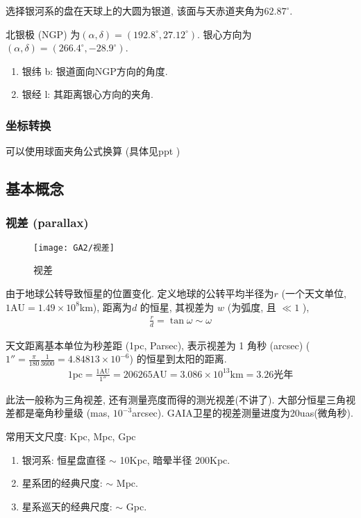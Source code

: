 选择银河系的盘在天球上的大圆为银道, 该面与天赤道夹角为$62.87^{\circ}$. 

北银极 (NGP) 为$(\alpha, \delta)=(192.8^{\circ}, 27.12^{\circ}) $. 银心方向为$(\alpha, \delta)=(266.4^{\circ},-28.9^{\circ})$. 

\begin{enumerate}
    \item 银纬 b: 银道面向NGP方向的角度. 
    \item 银经 l: 其距离银心方向的夹角. 
\end{enumerate}

\subsubsection{坐标转换}
可以使用球面夹角公式换算 (具体见ppt )

\subsection{基本概念}

\subsubsection{视差 (parallax)}
\begin{figure}[!htb]
    \centering
    \texttt{[image: GA2/视差]}
    \caption{视差}
\end{figure}


由于地球公转导致恒星的位置变化. 定义地球的公转平均半径为$r$ (一个天文单位,  $1\mathrm{AU}=1.49\times 10^8$km), 距离为$d$ 的恒星, 其视差为 $w$ (为弧度, 且 $\ll 1$ ), 
\begin{align*}
    \frac{r}{d}=\tan \omega \sim \omega
\end{align*} 

天文距离基本单位为秒差距 (1pc, Parsec), 表示视差为 1 角秒 (arcsec) ($1''=\frac{\pi}{180}\frac{1}{3600}=4.84813\times 10^{-6}$) 的恒星到太阳的距离. 
\begin{align*}
    1\mathrm{pc}=\frac{1\mathrm{AU}}{1''}=206265\mathrm{AU}=3.086\times 10^{13}\mathrm{km}=3.26\text{光年}
\end{align*}

此法一般称为三角视差, 还有测量亮度而得的测光视差(不讲了). 大部分恒星三角视差都是毫角秒量级 (mas, $10^{-3}$arcsec). GAIA卫星的视差测量进度为20uas(微角秒). 

常用天文尺度: Kpc, Mpc, Gpc
\begin{enumerate}
    \item 银河系: 恒星盘直径 $\sim$ 10Kpc, 暗晕半径 200Kpc. 
    \item 星系团的经典尺度: $\sim$ Mpc. 
    \item 星系巡天的经典尺度: $\sim$ Gpc. 
\end{enumerate}

